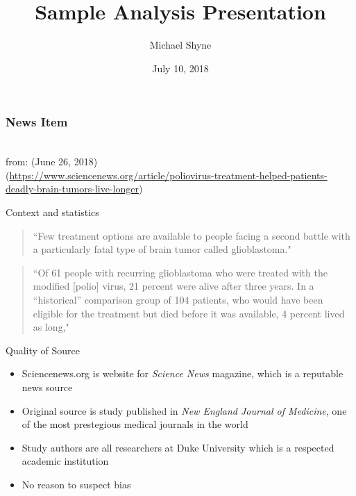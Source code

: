 \documentclass{beamer}
\title[Short title]{Sample Analysis Presentation}
\author[M. Shyne]{\Large Michael Shyne}
\date{July 10, 2018}
\begin{document}
\frame{\titlepage}

\begin{frame}
\frametitle{News Item}
{\centering 
{}\\
\medskip
from:  (June 26, 2018)\\
\smallskip
(\href{https://www.sciencenews.org/article/poliovirus-treatment-helped-patients-deadly-brain-tumors-live-longer}{https://www.sciencenews.org/article/poliovirus-treatment-helped-patients-deadly-brain-tumors-live-longer})\\
\par}
\end{frame}

\begin{frame}{Context and statistics}
\begin{quote}
``Few treatment options are available to people facing a second battle with a particularly fatal type of brain tumor called glioblastoma." 
\end{quote}
\begin{quote}
``Of 61 people with recurring glioblastoma who were treated with the modified [polio] virus, 21 percent were alive after three years. In a “historical” comparison group of 104 patients, who would have been eligible for the treatment but died before it was available, 4 percent lived as long,"
\end{quote}
\end{frame}

\begin{frame}{Quality of Source}
\begin{itemize}
\item Sciencenews.org is website for \emph{Science News} magazine, which is a reputable news source
\item Original source is study published in \emph{New England Journal of Medicine}, one of the most prestegious medical journals in the world
\item Study authors are all researchers at Duke University which is a respected academic institution
\item No reason to suspect bias
\end{itemize}
\end{frame}
\end{document}
